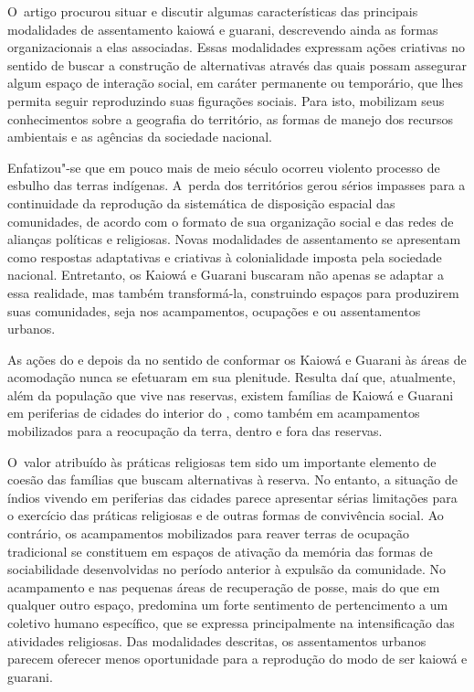 O~artigo procurou situar e discutir algumas características das
principais modalidades de assentamento kaiowá e guarani, descrevendo
ainda as formas organizacionais a elas associadas. Essas modalidades
expressam ações criativas no sentido de buscar a construção de
alternativas através das quais possam assegurar algum espaço de
interação social, em caráter permanente ou temporário, que lhes permita
seguir reproduzindo suas figurações sociais. Para isto, mobilizam seus
conhecimentos sobre a geografia do território, as formas de manejo dos
recursos ambientais e as agências da sociedade nacional. 

Enfatizou"-se que em pouco mais de meio século ocorreu violento processo
de esbulho das terras indígenas. A~perda dos territórios gerou sérios
impasses para a continuidade da reprodução da sistemática de disposição
espacial das comunidades, de acordo com o formato de sua organização
social e das redes de alianças políticas e religiosas. Novas
modalidades de assentamento se apresentam como respostas adaptativas e
criativas à colonialidade imposta pela sociedade nacional. Entretanto,
os Kaiowá e Guarani buscaram não apenas se adaptar a essa realidade,
mas também transformá-la, construindo espaços para produzirem suas
comunidades, seja nos acampamentos, ocupações e ou assentamentos
urbanos.

As ações do  e depois da  no sentido de conformar os Kaiowá e
Guarani às áreas de acomodação nunca se efetuaram em sua plenitude.
Resulta daí que, atualmente, além da população que vive nas reservas,
existem famílias de Kaiowá e Guarani em periferias de cidades do
interior do , como também em acampamentos mobilizados para a
reocupação da terra, dentro e fora das reservas.

O~valor atribuído às práticas religiosas tem sido um importante elemento
de coesão das famílias que buscam alternativas à reserva. No entanto, a
situação de índios vivendo em periferias das cidades parece apresentar
sérias limitações para o exercício das práticas religiosas e de outras
formas de convivência social. Ao contrário, os acampamentos mobilizados
para reaver terras de ocupação tradicional se constituem em espaços de
ativação da memória das formas de sociabilidade desenvolvidas no
período anterior à expulsão da comunidade. No acampamento e nas
pequenas áreas de recuperação de posse, mais do que em qualquer outro
espaço, predomina um forte sentimento de pertencimento a um coletivo
humano específico, que se expressa principalmente na intensificação das
atividades religiosas. Das modalidades descritas, os assentamentos
urbanos parecem oferecer menos oportunidade para a reprodução do modo
de ser kaiowá e guarani. 

